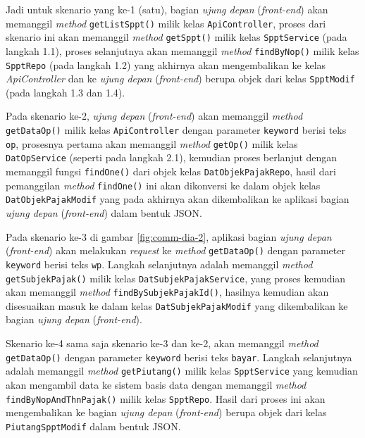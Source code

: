 \documentclass[pdftex,12pt, oneside]{article}
\begin{document}
Jadi untuk skenario yang ke-1 (satu), bagian \textit{ujung depan} (\textit{front-end}) akan memanggil \textit{method} \texttt{getListSppt()}  milik kelas \texttt{ApiController}, proses dari skenario ini akan memanggil \textit{method} \texttt{getSppt()} milik kelas \texttt{SpptService} (pada langkah 1.1), proses selanjutnya akan memanggil \textit{method} \texttt{findByNop()} milik kelas \texttt{SpptRepo} (pada langkah 1.2) yang akhirnya akan mengembalikan ke kelas \textit{ApiController} dan ke \textit{ujung depan} (\textit{front-end}) berupa objek dari kelas \texttt{SpptModif} (pada langkah 1.3 dan 1.4).

Pada skenario ke-2, \textit{ujung depan} (\textit{front-end}) akan memanggil \textit{method} \texttt{getDataOp()} milik kelas \texttt{ApiController} dengan parameter \texttt{keyword} berisi teks \texttt{op}, prosesnya pertama akan memanggil \textit{method} \texttt{getOp()} milik kelas \texttt{DatOpService} (seperti pada langkah 2.1), kemudian proses berlanjut dengan memanggil fungsi \texttt{findOne()} dari objek kelas \texttt{DatObjekPajakRepo}, hasil dari pemanggilan \textit{method} \texttt{findOne()} ini akan dikonversi ke dalam objek kelas \texttt{DatObjekPajakModif} yang pada akhirnya akan dikembalikan ke aplikasi bagian \textit{ujung depan} (\textit{front-end}) dalam bentuk JSON.

Pada skenario ke-3 di gambar \ref{fig:comm-dia-2}, aplikasi bagian \textit{ujung depan} (\textit{front-end}) akan melakukan \textit{request} ke \textit{method} \texttt{getDataOp()} dengan parameter \texttt{keyword} berisi teks \texttt{wp}. Langkah selanjutnya adalah memanggil \textit{method} \texttt{getSubjekPajak()} milik kelas \texttt{DatSubjekPajakService}, yang proses kemudian akan memanggil \textit{method} \texttt{findBySubjekPajakId()}, hasilnya kemudian akan disesuaikan masuk ke dalam kelas \texttt{DatSubjekPajakModif} yang dikembalikan ke bagian \textit{ujung depan} (\textit{front-end}).

Skenario ke-4 sama saja skenario ke-3 dan ke-2, akan memanggil \textit{method} \texttt{getDataOp()} dengan parameter \texttt{keyword} berisi teks \texttt{bayar}. Langkah selanjutnya adalah memanggil \textit{method} \texttt{getPiutang()} milik kelas \texttt{SpptService} yang kemudian akan mengambil data ke sistem basis data dengan memanggil \textit{method} \texttt{findByNopAndThnPajak()} milik kelas \texttt{SpptRepo}. Hasil dari proses ini akan mengembalikan ke bagian \textit{ujung depan} (\textit{front-end}) berupa objek dari kelas \texttt{PiutangSpptModif} dalam bentuk JSON.
\end{document}
